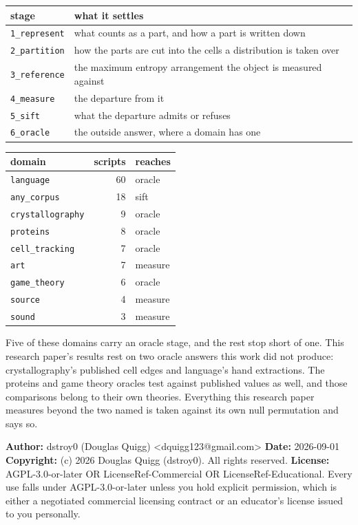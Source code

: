 \begin{center}
\begin{tabular}{@{}>{\raggedright\arraybackslash}p{}>{\raggedright\arraybackslash}p{}@{}}
\toprule
stage & what it settles \\
\midrule
\texttt{1\_represent} & what counts as a part, and how a part is written down \\
\texttt{2\_partition}  & how the parts are cut into the cells a distribution is taken over \\
\texttt{3\_reference}  & the maximum entropy arrangement the object is measured against \\
\texttt{4\_measure}    & the departure from it \\
\texttt{5\_sift}       & what the departure admits or refuses \\
\texttt{6\_oracle}     & the outside answer, where a domain has one \\
\bottomrule
\end{tabular}
\end{center}

\begin{center}
\begin{tabular}{@{}>{\raggedright\arraybackslash}p{}rl@{}}
\toprule
domain & scripts & reaches \\
\midrule
\texttt{language}        & 60 & oracle \\
\texttt{any\_corpus}     & 18 & sift \\
\texttt{crystallography} &  9 & oracle \\
\texttt{proteins}        &  8 & oracle \\
\texttt{cell\_tracking}  &  7 & oracle \\
\texttt{art}             &  7 & measure \\
\texttt{game\_theory}    &  6 & oracle \\
\texttt{source}          &  4 & measure \\
\texttt{sound}           &  3 & measure \\
\bottomrule
\end{tabular}
\end{center}

Five of these domains carry an oracle stage, and the rest stop short of one. This research paper's results
rest on two oracle answers this work did not produce: crystallography's published cell edges and
language's hand extractions. The proteins and game theory oracles test against published values as
well, and those comparisons belong to their own theories. Everything this research paper measures beyond the
two named is taken against its own null permutation and says so.

\medskip

\textbf{Author:} dstroy0 (Douglas Quigg) <dquigg123@gmail.com> \textbf{Date:} 2026-09-01 \textbf{Copyright:} (c) 2026 Douglas Quigg (dstroy0). All rights reserved. \textbf{License:} AGPL-3.0-or-later OR LicenseRef-Commercial OR LicenseRef-Educational. Every use falls under AGPL-3.0-or-later unless you hold explicit permission, which is either a negotiated commercial licensing contract or an educator's license issued to you personally.

